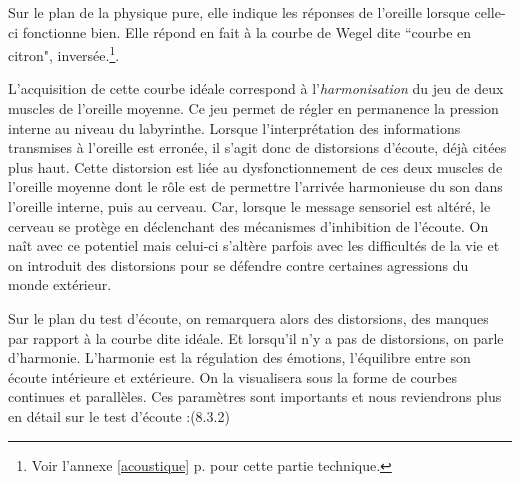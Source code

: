       
Sur le plan de la physique pure, elle indique les réponses de l'oreille
lorsque celle-ci fonctionne bien. Elle répond en fait à la courbe
de Wegel dite ``courbe en citron", inversée.\footnote{%
		Voir l'annexe \ref{acoustique} p. \pageref{acoustique}
		 pour cette partie technique.}.

               

L'acquisition de cette courbe idéale correspond à l'\textsl{harmonisation}
du jeu de deux muscles de l'oreille moyenne. Ce jeu
permet de régler en permanence la pression interne au niveau du
labyrinthe.
Lorsque l'interprétation des informations transmises à l'oreille est
erronée, il s'agit donc  de
distorsions d'écoute, déjà citées plus haut. Cette distorsion est liée au dysfonctionnement
de ces deux muscles de l'oreille moyenne dont le rôle est de permettre l'arrivée
harmonieuse du son dans l'oreille interne, puis au cerveau. Car, lorsque
le message sensoriel est altéré, le cerveau se protège en déclenchant
des mécanismes d'inhibition de l'écoute. On naît
avec ce potentiel mais celui-ci s'altère parfois avec les difficultés
de la vie et on introduit des distorsions
pour se défendre contre certaines agressions du monde extérieur. 

Sur le plan du test d'écoute, on remarquera
alors des distorsions, des manques par rapport à la courbe dite 
idéale.
Et lorsqu'il n'y a pas de distorsions, on parle d'harmonie. L'harmonie
est la régulation des émotions, l'équilibre entre son écoute
intérieure et extérieure. On la visualisera sous la forme de
courbes continues et parallèles.
Ces paramètres sont importants et nous reviendrons plus en détail sur le test d'écoute :(8.3.2)




  




 




  

